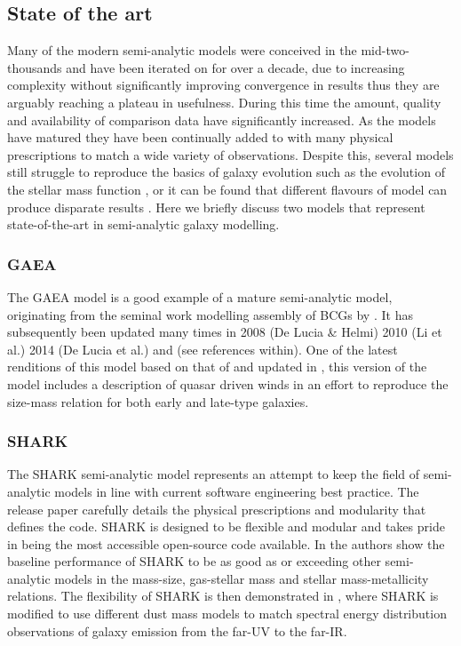 \subsection{State of the art}
Many of the modern semi-analytic models were conceived in the mid-two-thousands and have been iterated on for over a decade, due to increasing complexity without significantly improving convergence in results thus they are arguably reaching a plateau in usefulness. During this time the amount, quality and availability of comparison data have significantly increased. As the models have matured they have been continually added to with many physical prescriptions to match a wide variety of observations. Despite this, several models still struggle to reproduce the basics of galaxy evolution such as the evolution of the stellar mass function \cite{Asquith2018CosmicModels}, or it can be found that different flavours of model can produce disparate results \cite{Snaith2011AModels}. Here we briefly discuss two models that represent state-of-the-art in semi-analytic galaxy modelling.

\subsubsection{GAEA}
The GAEA model is a good example of a mature semi-analytic model, originating from the seminal work modelling assembly of BCGs by \citet{DeLucia2007TheGalaxies}. It has subsequently been updated many times in 2008 (De Lucia \& Helmi) 2010 (Li et al.) 2014 (De Lucia et al.) and \citet{Hirschmann2016GalaxyModel} (see references within).
One of the latest renditions of this model based on that of \citep{Xie2017H2-basedFormation} and updated in \citep{Zoldan2019TheEvolution}, this version of the model includes a description of quasar driven winds in an effort to reproduce the size-mass relation for both early and late-type galaxies.

\subsubsection{SHARK}
The SHARK semi-analytic model represents an attempt to keep the field of semi-analytic models in line with current software engineering best practice. The release paper \citep{Lagos2018Shark:Formation} carefully details the physical prescriptions and modularity that defines the code. SHARK is designed to be flexible and modular and takes pride in being the most accessible open-source code available. In \citet{Lagos2018Shark:Formation} the authors show the baseline performance of SHARK to be as good as or exceeding other semi-analytic models in the mass-size, gas-stellar mass and stellar mass-metallicity relations. The flexibility of SHARK is then demonstrated in \citet{Lagos2019FromModel}, where  SHARK is modified to use different dust mass models to match spectral energy distribution observations of galaxy emission from the far-UV to the far-IR.

